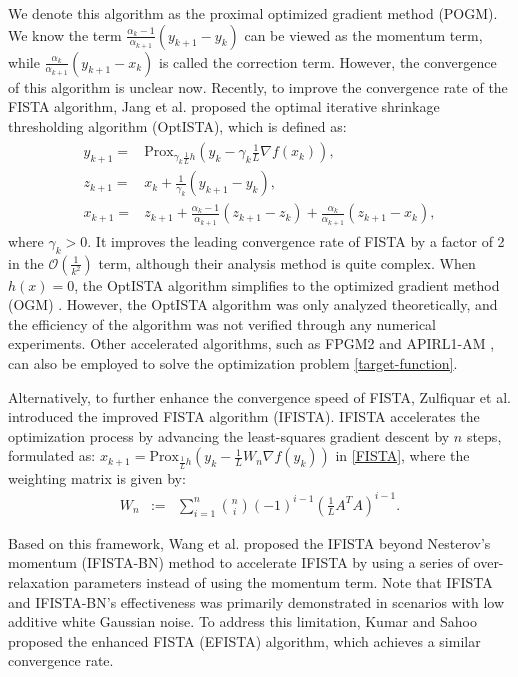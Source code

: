 \documentclass{article}
\begin{document}
We denote this algorithm as the proximal optimized gradient method (POGM). We know the term $\frac{\alpha_{k}-1}{\alpha_{k+1}}(y_{k+1}-y_{k})$ can be viewed as the momentum term, while $\frac{\alpha_{k}}{\alpha_{k+1}}(y_{k+1}-x_{k})$ is called the correction term. However, the convergence of this algorithm is unclear now. Recently, to improve the convergence rate of the FISTA algorithm, Jang et al. \cite{JangGR23} proposed the optimal iterative shrinkage thresholding algorithm (OptISTA), which is defined as:
\begin{eqnarray}
\begin{aligned}
y_{k+1}=&\mathrm{Prox}_{\gamma_{k}\frac{1}{L} h}(y_{k}-\gamma_{k}\frac{1}{L} \nabla f(x_{k})),\\
z_{k+1}=&x_{k}+\frac{1}{\gamma_{k}}(y_{k+1}-y_{k}),\\
x_{k+1}=&z_{k+1}+\frac{\alpha_{k}-1}{\alpha_{k+1}}(z_{k+1}-z_{k})+\frac{\alpha_{k}}{\alpha_{k+1}}(z_{k+1}-x_{k}),
\end{aligned}\label{OptISTA}
\end{eqnarray}
where $\gamma_{k} > 0$. It improves the leading convergence rate of FISTA by a factor of 2 in the $\mathcal{O}\left(\frac{1}{k^2}\right)$ term, although their analysis method is quite complex. When $h(x) = 0$, the OptISTA algorithm simplifies to the optimized gradient method (OGM) \cite{KimF16}. However, the OptISTA algorithm was only analyzed theoretically, and the efficiency of the algorithm was not verified through any numerical experiments.
Other accelerated algorithms, such as FPGM2 \cite{Taylor17} and APIRL1-AM \cite{AdamMHMN23}, can also be employed to solve the optimization problem \eqref{target-function}.

Alternatively, to further enhance the convergence speed of FISTA, Zulfiquar et al. \cite{BhottoAS15} introduced the improved FISTA algorithm (IFISTA). IFISTA accelerates the optimization process by advancing the least-squares gradient descent by $n$ steps, formulated as: $x_{k+1} = \mathrm{Prox}_{\frac{1}{L} h}(y_{k} - \frac{1}{L} W_{n} \nabla f(y_{k}))$ in \eqref{FISTA}, where the weighting matrix is given by:
\begin{eqnarray}
W_{n} &:=& \sum_{i=1}^{n} \binom{n}{i} (-1)^{i-1} \left(\frac{1}{L} A^{T}A\right)^{i-1} \label{weighting_matrix}.
\end{eqnarray}

Based on this framework, Wang et al. \cite{WangWWGC18} proposed the IFISTA beyond Nesterov's momentum (IFISTA-BN) method to accelerate IFISTA by using a series of over-relaxation parameters instead of using the momentum term. Note that IFISTA and IFISTA-BN’s effectiveness was primarily demonstrated in scenarios with low additive white Gaussian noise. To address this limitation, Kumar and Sahoo \cite{KumarS24} proposed the enhanced FISTA (EFISTA) algorithm, which achieves a similar convergence rate.
\end{document}
